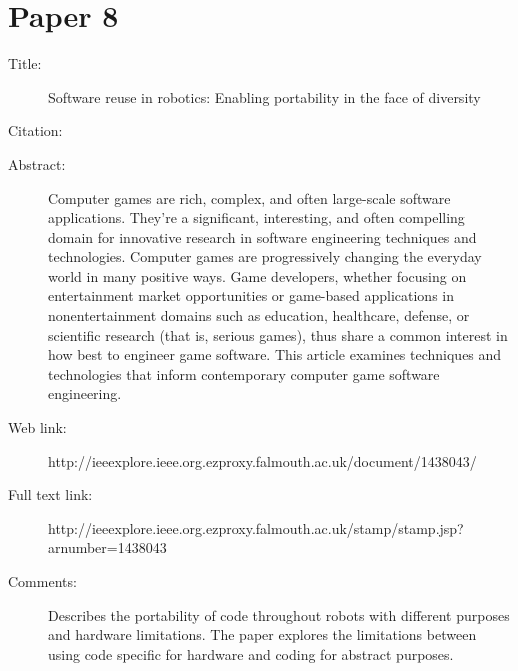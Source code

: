 \documentclass{scrartcl}
\begin{document}
\section*{Paper 8}
\begin{description}
\item[Title:] Software reuse in robotics: Enabling portability in the face of diversity
\item[Citation:] \cite{RobotSmith}
\item[Abstract:] Computer games are rich, complex, and often large-scale software applications. They're a significant, interesting, and often compelling domain for innovative research in software engineering techniques and technologies. Computer games are progressively changing the everyday world in many positive ways. Game developers, whether focusing on entertainment market opportunities or game-based applications in nonentertainment domains such as education, healthcare, defense, or scientific research (that is, serious games), thus share a common interest in how best to engineer game software. This article examines techniques and technologies that inform contemporary computer game software engineering.
\item[Web link:] http://ieeexplore.ieee.org.ezproxy.falmouth.ac.uk/document/1438043/
\item[Full text link:] http://ieeexplore.ieee.org.ezproxy.falmouth.ac.uk/stamp/stamp.jsp?arnumber=1438043
\item[Comments:] 
Describes the portability of code throughout robots with different purposes and hardware limitations. 
The paper explores the limitations between using code specific for hardware and coding for abstract purposes. 
\end{description}
\end{document}
